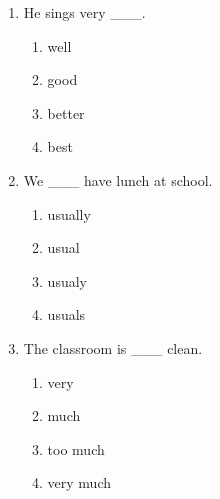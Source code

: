 \documentclass[11pt,a4paper]{ctexart}
\begin{document}
\begin{enumerate}[leftmargin=*,itemsep=4pt]
\begin{enumerate}[label=\Alph*.,leftmargin=2em,itemsep=1pt,topsep=2pt]
\end{enumerate}
\item He sings very \_\_\_.
\begin{enumerate}[label=\Alph*.,leftmargin=2em,itemsep=1pt,topsep=2pt]
\item well
\item good
\item better
\item best
\end{enumerate}
\item We \_\_\_ have lunch at school.
\begin{enumerate}[label=\Alph*.,leftmargin=2em,itemsep=1pt,topsep=2pt]
\item usually
\item usual
\item usualy
\item usuals
\end{enumerate}
\item The classroom is \_\_\_ clean.
\begin{enumerate}[label=\Alph*.,leftmargin=2em,itemsep=1pt,topsep=2pt]
\item very
\item much
\item too much
\item very much
\end{enumerate}
\end{enumerate}

\newpage
\end{document}
